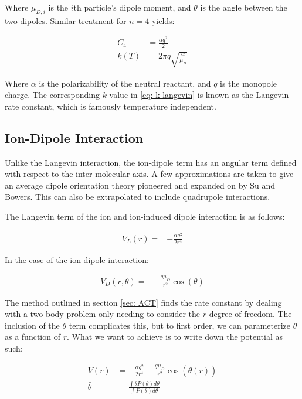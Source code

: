 Where $\mu_{D,i}$ is the $i$th particle's dipole moment, and $\theta$ is the angle between the two dipoles. Similar treatment for $n=4$ yields:

\begin{align}
	C_4 & = \frac{\alpha q^2}{2} \nonumber \\
	k(T) & = 2\pi q \sqrt{\frac{\alpha}{\mu_R}} \label{eq: k langevin}
\end{align}

Where $\alpha$ is the polarizability of the neutral reactant, and $q$ is the monopole charge. The corresponding $k$ value in \cref{eq: k langevin} is known as the Langevin rate constant, which is famously temperature independent.

\subsection{Ion-Dipole Interaction}

Unlike the Langevin interaction, the ion-dipole term has an angular term defined with respect to the inter-molecular axis. A few approximations are taken to give an average dipole orientation theory pioneered and expanded on by Su and Bowers.\cite{Su1973, Su1973a} This can also be extrapolated to include quadrupole interactions.\cite{Su1975}

The Langevin term of the ion and ion-induced dipole interaction is as follows:

\begin{align}
	V_L(r)= &-\frac{\alpha q^2}{2r^4}
\end{align}

In the case of the ion-dipole interaction:

\begin{align}
	V_D(r, \theta) = & -\frac{q\mu_D}{r^2} \cos(\theta)
\end{align}

The method outlined in section \ref{sec: ACT} finds the rate constant by dealing with a two body problem only needing to consider the $r$ degree of freedom. The inclusion of the $\theta$ term complicates this, but to first order, we can parameterize $\theta$ as a function of $r$. What we want to achieve is to write down the potential as such:

\begin{align}
    V(r) & = -\frac{\alpha q^2}{2r^4} - \frac{q\mu_D}{r^2} \cos\left(\bar{\theta}(r)\right) \nonumber \\
    \bar{\theta} & = \frac{\int \theta P(\theta) d\theta}{\int P(\theta) d\theta} \label{eq: avg theta}
\end{align}

